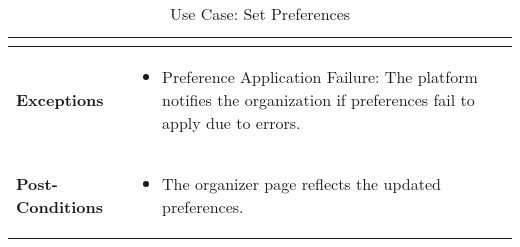 \begin{table}[!ht]
\begin{tabularx}{\textwidth}{|l|X|}
\begin{itemize}[label=--,itemsep=0pt]
        \end{itemize} \\
        \hline
        \textbf{Exceptions} & 
        \begin{itemize}[label=--,itemsep=0pt]
            \item Preference Application Failure: The platform notifies the organization if preferences fail to apply due to errors.
        \end{itemize} \\
        \hline
        \textbf{Post-Conditions} & 
        \begin{itemize}[label=--,itemsep=0pt]
            \item The organizer page reflects the updated preferences.
        \end{itemize} \\
        \hline
    \end{tabularx}
    \caption{Use Case: Set Preferences}
    \label{tab:use-case-set-preferences}
\end{table}


